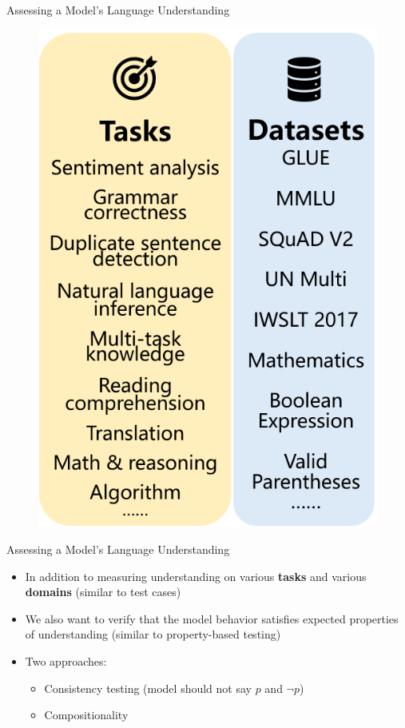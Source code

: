 \documentclass{beamer}
\begin{document}
\begin{frame}{Assessing a Model's Language Understanding}
    \begin{figure}
        \centering
        \includegraphics[height=0.8\textheight]{promptbench_2.png}
    \end{figure}
\end{frame}

\begin{frame}{Assessing a Model's Language Understanding}
    \begin{itemize}
        \item In addition to measuring understanding on various \textbf{tasks} and various \textbf{domains} (similar to \alert{test cases})
        \item We also want to verify that the model behavior satisfies expected properties of understanding (similar to \alert{property-based testing})
        \item Two approaches:
            \begin{itemize}
                \item Consistency testing (model should not say $p$ and $\neg p$)
                \item Compositionality
            \end{itemize}
    \end{itemize}
\end{frame}
\end{document}
